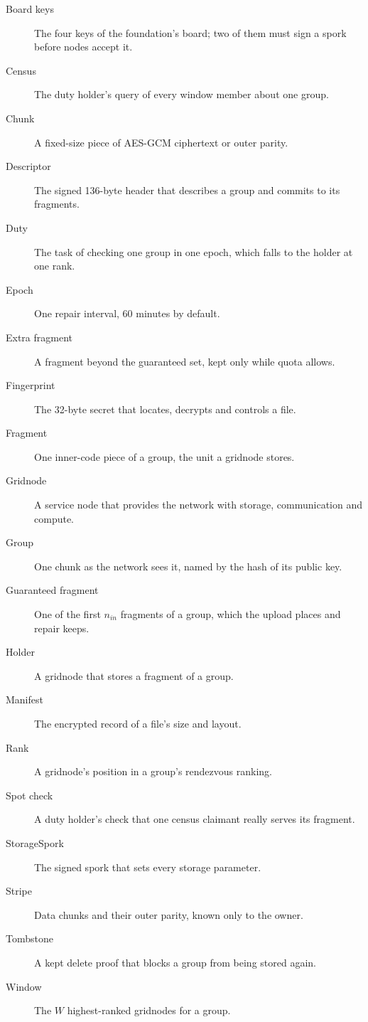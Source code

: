 \documentclass[10pt,a4paper,final]{article}
\begin{document}
\begin{description}
	\item[Board keys] The four keys of the foundation's board; two of them must sign a spork before nodes accept it.
	\item[Census] The duty holder's query of every window member about one group.
	\item[Chunk] A fixed-size piece of AES-GCM ciphertext or outer parity.
	\item[Descriptor] The signed 136-byte header that describes a group and commits to its fragments.
	\item[Duty] The task of checking one group in one epoch, which falls to the holder at one rank.
	\item[Epoch] One repair interval, 60 minutes by default.
	\item[Extra fragment] A fragment beyond the guaranteed set, kept only while quota allows.
	\item[Fingerprint] The 32-byte secret that locates, decrypts and controls a file.
	\item[Fragment] One inner-code piece of a group, the unit a gridnode stores.
	\item[Gridnode] A service node that provides the network with storage, communication and compute.
	\item[Group] One chunk as the network sees it, named by the hash of its public key.
	\item[Guaranteed fragment] One of the first $n_{in}$ fragments of a group, which the upload places and repair
	      keeps.
	\item[Holder] A gridnode that stores a fragment of a group.
	\item[Manifest] The encrypted record of a file's size and layout.
	\item[Rank] A gridnode's position in a group's rendezvous ranking.
	\item[Spot check] A duty holder's check that one census claimant really serves its fragment.
	\item[StorageSpork] The signed spork that sets every storage parameter.
	\item[Stripe] Data chunks and their outer parity, known only to the owner.
	\item[Tombstone] A kept delete proof that blocks a group from being stored again.
	\item[Window] The $W$ highest-ranked gridnodes for a group.
\end{description}
\end{document}
